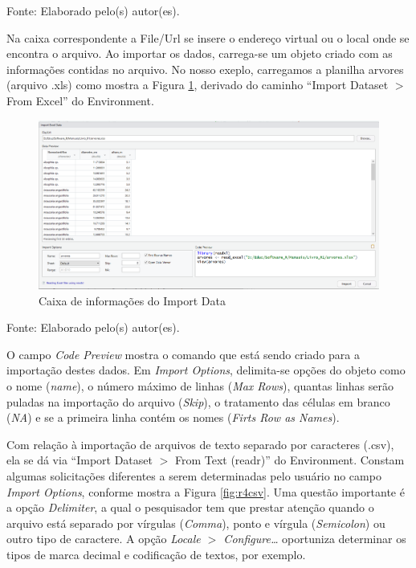 \documentclass[12pt,portuguese,oneside]{book}
\begin{document}
Fonte: Elaborado pelo(s) autor(es).

Na caixa correspondente a File/Url se insere o endereço virtual ou o
local onde se encontra o arquivo. Ao importar os dados, carrega-se um
objeto criado com as informações contidas no arquivo. No nosso exeplo,
carregamos a planilha arvores (arquivo .xls) como mostra a Figura
\ref{fig:r4}, derivado do caminho ``Import Dataset \(>\) From Excel'' do
Environment.

\begin{figure}[H]

{\centering \includegraphics[width=0.8\linewidth]{r4} 

}

\caption{Caixa de informações do Import Data}\label{fig:r4}
\end{figure}

Fonte: Elaborado pelo(s) autor(es).

O campo \emph{Code Preview} mostra o comando que está sendo criado para
a importação destes dados. Em \emph{Import Options}, delimita-se opções
do objeto como o nome (\emph{name}), o número máximo de linhas
(\emph{Max Rows}), quantas linhas serão puladas na importação do arquivo
(\emph{Skip}), o tratamento das células em branco (\emph{NA}) e se a
primeira linha contém os nomes (\emph{Firts Row as Names}).

Com relação à importação de arquivos de texto separado por caracteres
(.csv), ela se dá via ``Import Dataset \(>\) From Text (readr)'' do
Environment. Constam algumas solicitações diferentes a serem
determinadas pelo usuário no campo \emph{Import Options}, conforme
mostra a Figura \ref{fig:r4csv}. Uma questão importante é a opção
\emph{Delimiter}, a qual o pesquisador tem que prestar atenção quando o
arquivo está separado por vírgulas (\emph{Comma}), ponto e vírgula
(\emph{Semicolon}) ou outro tipo de caractere. A opção \emph{Locale
\(>\) Configure\ldots{}} oportuniza determinar os tipos de marca decimal
e codificação de textos, por exemplo.
\end{document}
